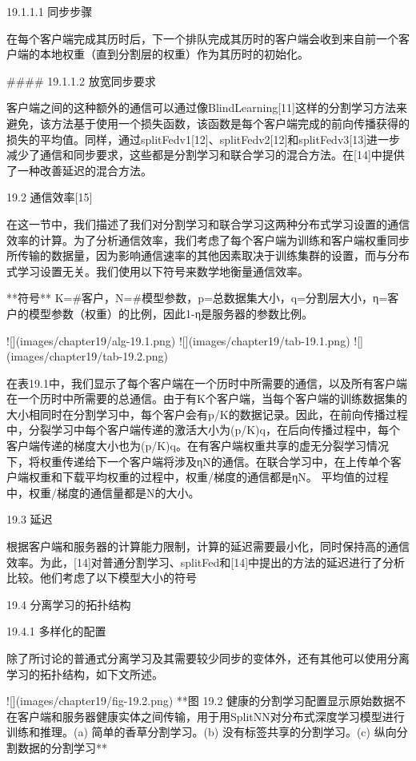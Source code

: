 19.1.1.1 同步步骤

在每个客户端完成其历时后，下一个排队完成其历时的客户端会收到来自前一个客户端的本地权重（直到分割层的权重）作为其历时的初始化。

#### 19.1.1.2 放宽同步要求

客户端之间的这种额外的通信可以通过像BlindLearning[11]这样的分割学习方法来避免，该方法基于使用一个损失函数，该函数是每个客户端完成的前向传播获得的损失的平均值。同样，通过splitFedv1[12]、splitFedv2[12]和splitFedv3[13]进一步减少了通信和同步要求，这些都是分割学习和联合学习的混合方法。在[14]中提供了一种改善延迟的混合方法。

 19.2 通信效率[15]

在这一节中，我们描述了我们对分割学习和联合学习这两种分布式学习设置的通信效率的计算。为了分析通信效率，我们考虑了每个客户端为训练和客户端权重同步所传输的数据量，因为影响通信速率的其他因素取决于训练集群的设置，而与分布式学习设置无关。我们使用以下符号来数学地衡量通信效率。

**符号** K=#客户，N=#模型参数，p=总数据集大小，q=分割层大小，η=客户的模型参数（权重）的比例，因此1-η是服务器的参数比例。

![](images/chapter19/alg-19.1.png)
![](images/chapter19/tab-19.1.png)
![](images/chapter19/tab-19.2.png)

在表19.1中，我们显示了每个客户端在一个历时中所需要的通信，以及所有客户端在一个历时中所需要的总通信。由于有K个客户端，当每个客户端的训练数据集的大小相同时在分割学习中，每个客户会有p/K的数据记录。因此，在前向传播过程中，分裂学习中每个客户端传递的激活大小为(p/K)q，在后向传播过程中，每个客户端传递的梯度大小也为(p/K)q。在有客户端权重共享的虚无分裂学习情况下，将权重传递给下一个客户端将涉及ηN的通信。在联合学习中，在上传单个客户端权重和下载平均权重的过程中，权重/梯度的通信都是ηN。
平均值的过程中，权重/梯度的通信量都是N的大小。

19.3 延迟

根据客户端和服务器的计算能力限制，计算的延迟需要最小化，同时保持高的通信效率。为此，[14]对普通分割学习、splitFed和[14]中提出的方法的延迟进行了分析比较。他们考虑了以下模型大小的符号

19.4 分离学习的拓扑结构

19.4.1 多样化的配置

除了所讨论的普通式分离学习及其需要较少同步的变体外，还有其他可以使用分离学习的拓扑结构，如下文所述。

![](images/chapter19/fig-19.2.png)
**图 19.2 健康的分割学习配置显示原始数据不在客户端和服务器健康实体之间传输，用于用SplitNN对分布式深度学习模型进行训练和推理。(a) 简单的香草分割学习。(b) 没有标签共享的分割学习。(c) 纵向分割数据的分割学习**

